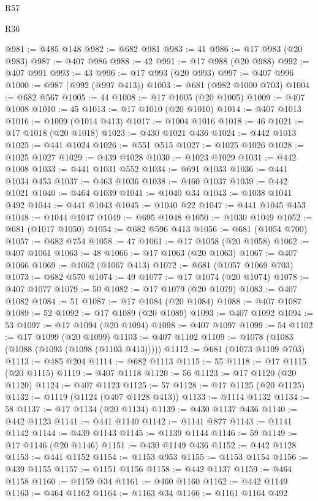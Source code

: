 \begin{lexlean}{R57}
\begin{lexlean}{R36}
\begin{coremodule}
{{{{{{{{{{{{{{{{{{{{{{{{{{{{{{{{{{{{{{{{{{{{{{{{{{{{{{{{{{{{{{{{{{{{{{{{{{{{{{{{{{@981 := @485 @148
@982 := @682 @981
@983 := 41
@986 := @17 @983 (@20 @983)
@987 := @407 @986
@988 := 42
@991 := @17 @988 (@20 @988)
@992 := @407 @991
@993 := 43
@996 := @17 @993 (@20 @993)
@997 := @407 @996
@1000 := @987 (@992 (@997 @413))
@1003 := @681 (@982 @1000 @703)
@1004 := @682 @567
@1005 := 44
@1008 := @17 @1005 (@20 @1005)
@1009 := @407 @1008
@1010 := 45
@1013 := @17 @1010 (@20 @1010)
@1014 := @407 @1013
@1016 := @1009 (@1014 @413)
@1017 := @1004 @1016
@1018 := 46
@1021 := @17 @1018 (@20 @1018)
@1023 := @430 @1021 @436
@1024 := @442 @1013
@1025 := @441 @1024
@1026 := @551 @515
@1027 := @1025 @1026
@1028 := @1025 @1027
@1029 := @439 @1028
@1030 := @1023 @1029
@1031 := @442 @1008
@1033 := @441 @1031 @552
@1034 := @691 @1033
@1036 := @441 @1034 @453
@1037 := @463 @1036
@1038 := @460 @1037
@1039 := @442 @1021
@1040 := @464 @1039
@1041 := @1040 @34
@1043 := @1038 @1041 @492
@1044 := @441 @1043
@1045 := @1040 @22
@1047 := @441 @1045 @453
@1048 := @1044 @1047
@1049 := @695 @1048
@1050 := @1030 @1049
@1052 := @681 (@1017 @1050)
@1054 := @682 @596 @413
@1056 := @681 (@1054 @700)
@1057 := @682 @754
@1058 := 47
@1061 := @17 @1058 (@20 @1058)
@1062 := @407 @1061
@1063 := 48
@1066 := @17 @1063 (@20 @1063)
@1067 := @407 @1066
@1069 := @1062 (@1067 @413)
@1072 := @681 (@1057 @1069 @703)
@1073 := @682 @570
@1074 := 49
@1077 := @17 @1074 (@20 @1074)
@1078 := @407 @1077
@1079 := 50
@1082 := @17 @1079 (@20 @1079)
@1083 := @407 @1082
@1084 := 51
@1087 := @17 @1084 (@20 @1084)
@1088 := @407 @1087
@1089 := 52
@1092 := @17 @1089 (@20 @1089)
@1093 := @407 @1092
@1094 := 53
@1097 := @17 @1094 (@20 @1094)
@1098 := @407 @1097
@1099 := 54
@1102 := @17 @1099 (@20 @1099)
@1103 := @407 @1102
@1109 := @1078 (@1083 (@1088 (@1093 (@1098 (@1103 @413)))))
@1112 := @681 (@1073 @1109 @703)
@1113 := @485 @204
@1114 := @682 @1113
@1115 := 55
@1118 := @17 @1115 (@20 @1115)
@1119 := @407 @1118
@1120 := 56
@1123 := @17 @1120 (@20 @1120)
@1124 := @407 @1123
@1125 := 57
@1128 := @17 @1125 (@20 @1125)
@1132 := @1119 (@1124 (@407 @1128 @413))
@1133 := @1114 @1132
@1134 := 58
@1137 := @17 @1134 (@20 @1134)
@1139 := @430 @1137 @436
@1140 := @442 @1123
@1141 := @441 @1140
@1142 := @1141 @877
@1143 := @1141 @1142
@1144 := @439 @1143
@1145 := @1139 @1144
@1146 := 59
@1149 := @17 @1146 (@20 @1146)
@1151 := @430 @1149 @436
@1152 := @442 @1128
@1153 := @441 @1152
@1154 := @1153 @953
@1155 := @1153 @1154
@1156 := @439 @1155
@1157 := @1151 @1156
@1158 := @442 @1137
@1159 := @464 @1158
@1160 := @1159 @34
@1161 := @460 @1160
@1162 := @442 @1149
@1163 := @464 @1162
@1164 := @1163 @34
@1166 := @1161 @1164 @492
}}}}}}}}}}}}}}}}}}}}}}}}}}}}}}}}}}}}}}}}}}}}}}}}}}}}}}}}}}}}}}}}}}}}}}}}}}}}}}}}}}
\end{coremodule}
\end{lexlean}
\end{lexlean}
